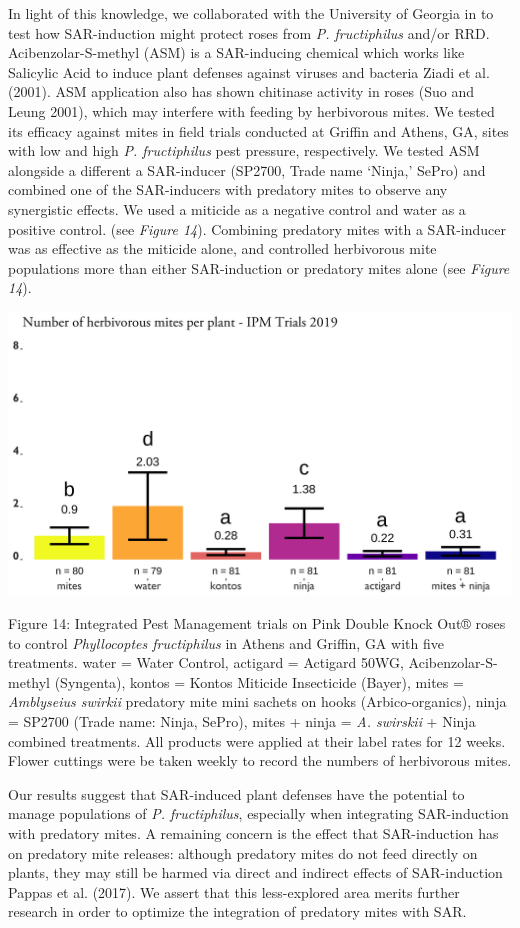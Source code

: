 \documentclass[12pt,final,CPage]{ufthesis}
\begin{document}
{  In light of this knowledge, we collaborated with the University of Georgia in to test how SAR-induction might protect roses from \emph{P. fructiphilus} and/or RRD. Acibenzolar-S-methyl (ASM) is a SAR-inducing chemical which works like Salicylic Acid to induce plant defenses against viruses and bacteria Ziadi et al. (2001). ASM application also has shown chitinase activity in roses (Suo and Leung 2001), which may interfere with feeding by herbivorous mites. We tested its efficacy against mites in field trials conducted at Griffin and Athens, GA, sites with low and high \emph{P. fructiphilus} pest pressure, respectively. We tested ASM alongside a different a SAR-inducer (SP2700, Trade name `Ninja,' SePro) and combined one of the SAR-inducers with predatory mites to observe any synergistic effects. We used a miticide as a negative control and water as a positive control. (see \emph{Figure 14}). Combining predatory mites with a SAR-inducer was as effective as the miticide alone, and controlled herbivorous mite populations more than either SAR-induction or predatory mites alone (see \emph{Figure 14}).
  \begin{center}\includegraphics[width=0.8\linewidth]{figure/ipm_graph} \end{center}

  Figure 14: Integrated Pest Management trials on Pink Double Knock Out® roses to control \emph{Phyllocoptes fructiphilus} in Athens and Griffin, GA with five treatments. water = Water Control, actigard = Actigard 50WG, Acibenzolar-S-methyl (Syngenta), kontos = Kontos Miticide Insecticide (Bayer), mites = \emph{Amblyseius swirkii} predatory mite mini sachets on hooks (Arbico-organics), ninja = SP2700 (Trade name: Ninja, SePro), mites + ninja = \emph{A. swirskii} + Ninja combined treatments. All products were applied at their label rates for 12 weeks. Flower cuttings were be taken weekly to record the numbers of herbivorous mites.

  Our results suggest that SAR-induced plant defenses have the potential to manage populations of \emph{P. fructiphilus}, especially when integrating SAR-induction with predatory mites. A remaining concern is the effect that SAR-induction has on predatory mite releases: although predatory mites do not feed directly on plants, they may still be harmed via direct and indirect effects of SAR-induction Pappas et al. (2017). We assert that this less-explored area merits further research in order to optimize the integration of predatory mites with SAR.

}
\end{document}
